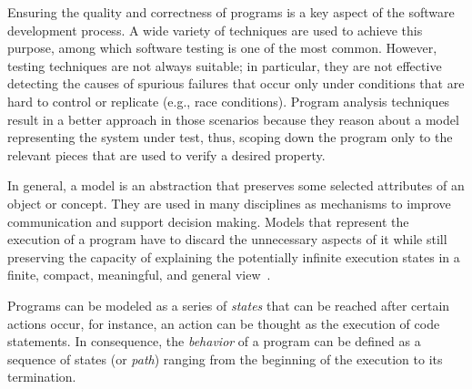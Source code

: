 

Ensuring the quality and correctness of programs is a key aspect of the software development process. A wide variety of techniques are used to achieve this purpose, among which software testing is one of the most common. However, testing techniques are not always suitable; in particular, they are not effective detecting the causes of spurious failures that occur only under conditions that are hard to control or replicate (e.g., race conditions). Program analysis techniques result in a better approach in those scenarios because they reason about a model representing the system under test, thus, scoping down the program only to the relevant pieces that are used to verify a desired property.

In general, a model is an abstraction that preserves some selected attributes of an object or concept. They are used in many disciplines as mechanisms to improve communication and support decision making. Models that represent the execution of a program have to discard the unnecessary aspects of it while still preserving the capacity of explaining the potentially infinite execution states in a finite, compact, meaningful, and general view~\cite{BookPezze2008}.

Programs can be modeled as a series of \textit{states} that can be reached after certain actions occur, for instance, an action can be thought as the execution of code statements. In consequence, the \textit{behavior} of a program can be defined as a sequence of states (or \textit{path}) ranging from the beginning of the execution to its termination.

